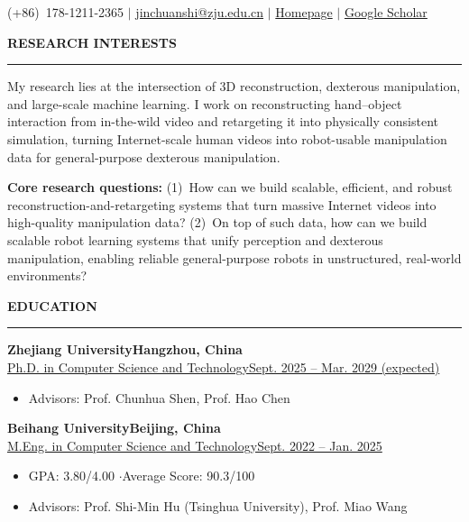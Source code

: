 \documentclass[10pt,a4paper]{article}
\newcommand{\cvsection}[1]{%
  \vspace{0.7em}%
  {\rmfamily\large\bfseries\MakeUppercase{#1}}\\[-0.3em]%
  \rule{\linewidth}{0.5pt}\par\vspace{0.3em}%
}
\newcommand{\cventry}[4]{%
  {\bfseries #1}\hfill{\bfseries #2}\\[0.12em]%
  \uline{#3}\hfill\uline{#4}\par}
\begin{document}
{\par}
\vspace{0.3em}
{\centering\small
(+86)~178-1211-2365 \quad$|$\quad
\href{mailto:jinchuanshi@zju.edu.cn}{jinchuanshi@zju.edu.cn} \quad$|$\quad
\href{https://chuan-10.github.io}{Homepage} \quad$|$\quad
\href{https://scholar.google.com/citations?user=N1Imm0oAAAAJ}{Google Scholar}\par}

\cvsection{Research Interests}
My research lies at the intersection of 3D reconstruction, dexterous manipulation, and large-scale
machine learning. I work on reconstructing hand--object interaction from in-the-wild video and
retargeting it into physically consistent simulation, turning Internet-scale human videos into
robot-usable manipulation data for general-purpose dexterous manipulation.

\vspace{0.35em}
\textbf{Core research questions:} (1)~How can we build scalable, efficient, and robust
reconstruction-and-retargeting systems that turn massive Internet videos into high-quality
manipulation data? (2)~On top of such data, how can we build scalable robot learning systems that
unify perception and dexterous manipulation, enabling reliable general-purpose robots in
unstructured, real-world environments?

\cvsection{Education}
\cventry{Zhejiang University}{Hangzhou, China}
        {Ph.D. in Computer Science and Technology}
        {Sept. 2025 -- Mar. 2029 (expected)}
\begin{itemize}
  \item Advisors: Prof. Chunhua Shen, Prof. Hao Chen
\end{itemize}
\vspace{0.35em}

\cventry{Beihang University}{Beijing, China}
        {M.Eng. in Computer Science and Technology}
        {Sept. 2022 -- Jan. 2025}
\begin{itemize}
  \item GPA: 3.80/4.00 \quad$\cdot$\quad Average Score: 90.3/100
  \item Advisors: Prof. Shi-Min Hu (Tsinghua University), Prof. Miao Wang
\end{itemize}
\vspace{0.35em}
\end{document}
